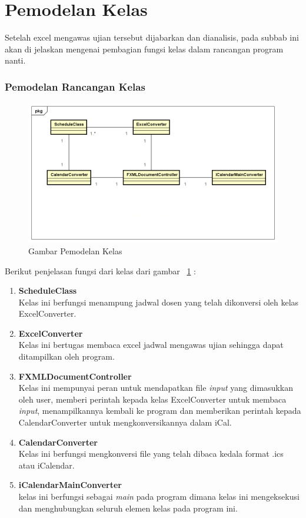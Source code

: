 \section{Pemodelan Kelas}
Setelah excel mengawas ujian tersebut dijabarkan dan dianalisis, pada subbab ini akan di jelaskan mengenai pembagian fungsi
kelas dalam rancangan program nanti.

\subsubsection{Pemodelan Rancangan Kelas}
\begin{figure}[H]
	\centering
	\includegraphics[scale=0.5]{Gambar/pemodelan-kelas}
	\caption{Gambar Pemodelan Kelas}
	\label{fig:pemodelan-kelas}
\end{figure}

Berikut penjelasan fungsi dari kelas dari gambar ~\ref{fig:pemodelan-kelas} :	
\begin{enumerate}
	\item \textbf{ScheduleClass}\\
	Kelas ini berfungsi menampung jadwal dosen yang telah dikonversi oleh kelas ExcelConverter.
	\item \textbf{ExcelConverter}\\
	Kelas ini bertugas membaca excel jadwal mengawas ujian sehingga dapat ditampilkan oleh program.
	\item \textbf{FXMLDocumentController}\\
	Kelas ini mempunyai peran untuk mendapatkan file \textit{input} yang dimasukkan oleh user,  memberi perintah 
	kepada kelas ExcelConverter untuk membaca \textit{input}, menampilkannya kembali ke program dan memberikan perintah
	kepada CalendarConverter untuk mengkonversikannya dalam iCal.
	\item \textbf{CalendarConverter}\\
	Kelas ini berfungsi mengkonversi file yang telah dibaca kedala format .ics atau iCalendar.
	\item \textbf{iCalendarMainConverter}\\
	kelas ini berfungsi sebagai \textit{main} pada program dimana kelas ini mengeksekusi dan menghubungkan seluruh elemen kelas 
	pada program ini.
\end{enumerate}
